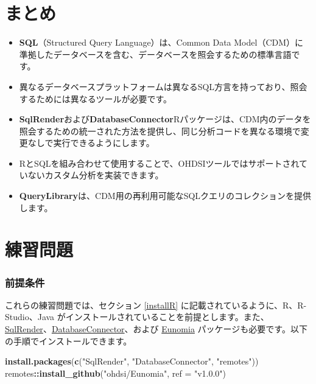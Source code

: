 \documentclass[
  11pt]{book}
\makeatletter
\newenvironment{Shaded}{\begin{snugshade}}{\end{snugshade}}
\newcommand{\AttributeTok}[1]{\textcolor[rgb]{0.13,0.29,0.53}{#1}}
\newcommand{\FunctionTok}[1]{\textcolor[rgb]{0.13,0.29,0.53}{\textbf{#1}}}
\newcommand{\NormalTok}[1]{#1}
\newcommand{\SpecialCharTok}[1]{\textcolor[rgb]{0.81,0.36,0.00}{\textbf{#1}}}
\newcommand{\StringTok}[1]{\textcolor[rgb]{0.31,0.60,0.02}{#1}}
\newenvironment{kframe}{%
\medskip{}
\setlength{\fboxsep}{.8em}
 \def\at@end@of@kframe{}%
 \ifinner\ifhmode%
  \def\at@end@of@kframe{\end{minipage}}%
  \begin{minipage}{\columnwidth}%
 \fi\fi%
 \def\FrameCommand##1{\hskip\@totalleftmargin \hskip-\fboxsep
 \colorbox{myShadeColor}{##1}\hskip-\fboxsep
     \hskip-\linewidth \hskip-\@totalleftmargin \hskip\columnwidth}%
 \MakeFramed {\advance\hsize-\width
   \@totalleftmargin\z@ \linewidth\hsize
   \@setminipage}}%
 {\par\unskip\endMakeFramed%
 \at@end@of@kframe}
\newenvironment{rmdblock}[1]
  {
  \begin{itemize}
  \renewcommand{\labelitemi}{
    \raisebox{-.7\height}[0pt][0pt]{
      {\setkeys{Gin}{width=3em,keepaspectratio}\texttt{[image: images/\#1]}}
    }
  }
  \setlength{\fboxsep}{1em}
  \begin{kframe}
  \item
  }
  {
  \end{kframe}
  \end{itemize}
  }
\newenvironment{rmdsummary}
  {\begin{rmdblock}{summary}}
  {\end{rmdblock}}
\theoremstyle{definition}
\theoremstyle{definition}
\theoremstyle{definition}
\theoremstyle{definition}
\theoremstyle{remark}
\makeatother
\begin{document}
\section{まとめ}\label{ux307eux3068ux3081-7}

\begin{rmdsummary}
\begin{itemize}
\item
  \textbf{SQL}（Structured Query Language）は、Common Data Model（CDM）に準拠したデータベースを含む、データベースを照会するための標準言語です。
\item
  異なるデータベースプラットフォームは異なるSQL方言を持っており、照会するためには異なるツールが必要です。
\item
  \textbf{SqlRender}および\textbf{DatabaseConnector}Rパッケージは、CDM内のデータを照会するための統一された方法を提供し、同じ分析コードを異なる環境で変更なしで実行できるようにします。
\item
  RとSQLを組み合わせて使用することで、OHDSIツールではサポートされていないカスタム分析を実装できます。
\item
  \textbf{QueryLibrary}は、CDM用の再利用可能なSQLクエリのコレクションを提供します。
\end{itemize}
\end{rmdsummary}

\section{練習問題}\label{ux7df4ux7fd2ux554fux984c-1}

\subsubsection*{前提条件}\label{ux524dux63d0ux6761ux4ef6-3}

これらの練習問題では、セクション \ref{installR} に記載されているように、R、R-Studio、Java がインストールされていることを前提とします。また、\href{https://ohdsi.github.io/SqlRender/}{SqlRender}、\href{https://ohdsi.github.io/DatabaseConnector/}{DatabaseConnector}、および \href{https://ohdsi.github.io/Eunomia/}{Eunomia} パッケージも必要です。以下の手順でインストールできます。

\begin{Shaded}
\begin{Highlighting}[]
\FunctionTok{install.packages}\NormalTok{(}\FunctionTok{c}\NormalTok{(}\StringTok{"SqlRender"}\NormalTok{, }\StringTok{"DatabaseConnector"}\NormalTok{, }\StringTok{"remotes"}\NormalTok{))}
\NormalTok{remotes}\SpecialCharTok{::}\FunctionTok{install\_github}\NormalTok{(}\StringTok{"ohdsi/Eunomia"}\NormalTok{, }\AttributeTok{ref =} \StringTok{"v1.0.0"}\NormalTok{)}
\end{Highlighting}
\end{Shaded}
\end{document}
